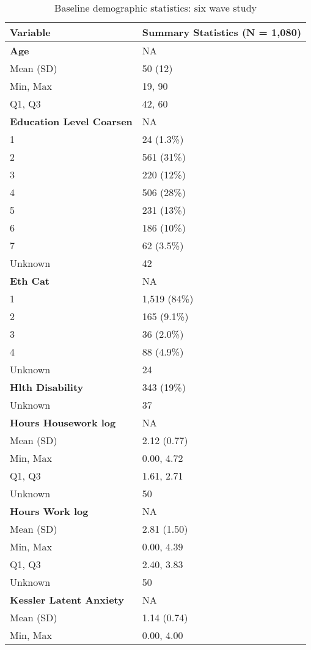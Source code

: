 \documentclass[
  single column]{article}
\begin{document}
\begin{longtable}[]{@{}ll@{}}

\caption{\label{tbl-table-demography-five-code-long}Baseline demographic
statistics: six wave study}

\tabularnewline

\toprule\noalign{}
Variable & Summary Statistics (N = 1,080) \\
\midrule\noalign{}
\endhead
\bottomrule\noalign{}
\endlastfoot
\textbf{Age} & NA \\
Mean (SD) & 50 (12) \\
Min, Max & 19, 90 \\
Q1, Q3 & 42, 60 \\
\textbf{Education Level Coarsen} & NA \\
1 & 24 (1.3\%) \\
2 & 561 (31\%) \\
3 & 220 (12\%) \\
4 & 506 (28\%) \\
5 & 231 (13\%) \\
6 & 186 (10\%) \\
7 & 62 (3.5\%) \\
Unknown & 42 \\
\textbf{Eth Cat} & NA \\
1 & 1,519 (84\%) \\
2 & 165 (9.1\%) \\
3 & 36 (2.0\%) \\
4 & 88 (4.9\%) \\
Unknown & 24 \\
\textbf{Hlth Disability} & 343 (19\%) \\
Unknown & 37 \\
\textbf{Hours Housework log} & NA \\
Mean (SD) & 2.12 (0.77) \\
Min, Max & 0.00, 4.72 \\
Q1, Q3 & 1.61, 2.71 \\
Unknown & 50 \\
\textbf{Hours Work log} & NA \\
Mean (SD) & 2.81 (1.50) \\
Min, Max & 0.00, 4.39 \\
Q1, Q3 & 2.40, 3.83 \\
Unknown & 50 \\
\textbf{Kessler Latent Anxiety} & NA \\
Mean (SD) & 1.14 (0.74) \\
Min, Max & 0.00, 4.00 \\

\end{longtable}
\end{document}
